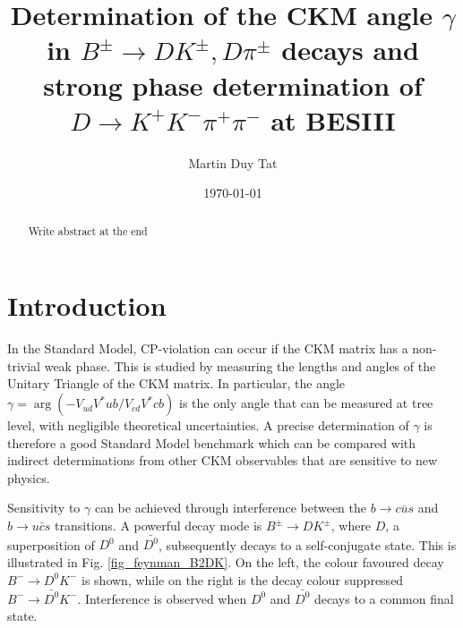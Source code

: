 \documentclass[12pt, a4paper, notitlepage, onecolumn]{article}
\title{Determination of the CKM angle $\gamma$ in $B^\pm\to DK^\pm, D\pi^\pm$ decays and strong phase determination of $D\to K^+K^-\pi^+\pi^-$ at BESIII}
\author{Martin Duy Tat}
\date{\today}
\numberwithin{equation}{section}
\begin{document}
\maketitle
\begin{abstract}
\noindent Write abstract at the end
\end{abstract}
\section{Introduction}
\noindent In the Standard Model, CP-violation can occur if the CKM matrix has a non-trivial weak phase. This is studied by measuring the lengths and angles of the Unitary Triangle of the CKM matrix. In particular, the angle $\gamma = \arg(-V_{ud}V^*{ub}/V_{cd}V^*{cb})$ is the only angle that can be measured at tree level, with negligible theoretical uncertainties. A precise determination of $\gamma$ is therefore a good Standard Model benchmark which can be compared with indirect determinations from other CKM observables that are sensitive to new physics.

Sensitivity to $\gamma$ can be achieved through interference between the $b\to c\bar{u}s$ and $b\to u\bar{c}s$ transitions. A powerful decay mode is $B^\pm\to DK^\pm$, where $D$, a superposition of $D^0$ and $\bar{D^0}$, subsequently decays to a self-conjugate state. This is illustrated in Fig. \ref{fig_feynman_B2DK}. On the left, the colour favoured decay $B^-\to D^0K^-$ is shown, while on the right is the decay colour suppressed $B^-\to\bar{D^0}K^-$. Interference is observed when $D^0$ and $\bar{D^0}$ decays to a common final state.
\end{document}
